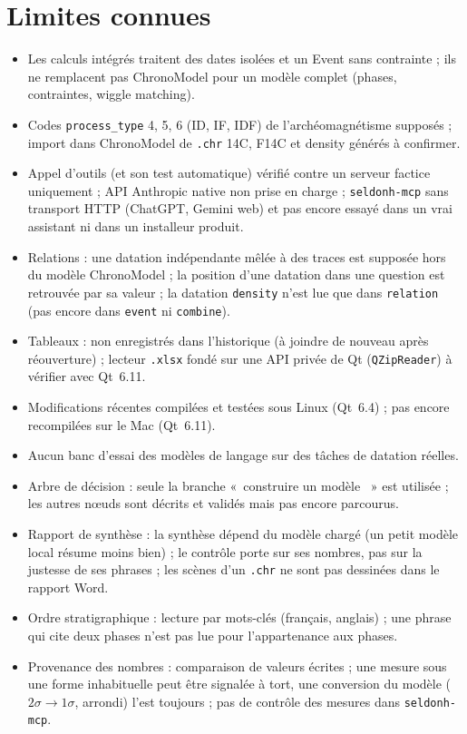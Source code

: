 \documentclass[11pt,a4paper]{article}
\providecommand{\og}{«~}\providecommand{\fg}{\unskip~»}
\newcommand{\code}[1]{\texttt{\small #1}}
\begin{document}
\section{Limites connues}
\begin{itemize}[leftmargin=*]
\item Les calculs intégrés traitent des dates isolées et un Event sans contrainte ; ils ne remplacent pas ChronoModel
  pour un modèle complet (phases, contraintes, wiggle matching).
\item Codes \code{process\_type} 4, 5, 6 (ID, IF, IDF) de l'archéomagnétisme supposés ; import dans ChronoModel de
  \code{.chr} 14C, F14C et density générés à confirmer.
\item Appel d'outils (et son test automatique) vérifié contre un serveur factice uniquement ; API Anthropic native
  non prise en charge ; \code{seldonh-mcp} sans transport HTTP (ChatGPT, Gemini web) et pas encore essayé dans un
  vrai assistant ni dans un installeur produit.
\item Relations : une datation indépendante mêlée à des traces est supposée hors du modèle ChronoModel ; la position
  d'une datation dans une question est retrouvée par sa valeur ; la datation \code{density} n'est lue que dans
  \code{relation} (pas encore dans \code{event} ni \code{combine}).
\item Tableaux : non enregistrés dans l'historique (à joindre de nouveau après réouverture) ; lecteur \code{.xlsx}
  fondé sur une API privée de Qt (\code{QZipReader}) à vérifier avec Qt~6.11.
\item Modifications récentes compilées et testées sous Linux (Qt~6.4) ; pas encore recompilées sur le Mac (Qt~6.11).
\item Aucun banc d'essai des modèles de langage sur des tâches de datation réelles.
\item Arbre de décision : seule la branche \og construire un modèle \fg{} est utilisée ; les autres nœuds sont décrits
  et validés mais pas encore parcourus.
\item Rapport de synthèse : la synthèse dépend du modèle chargé (un petit modèle local résume moins bien) ; le
  contrôle porte sur ses nombres, pas sur la justesse de ses phrases ; les scènes d'un \code{.chr} ne sont pas
  dessinées dans le rapport Word.
\item Ordre stratigraphique : lecture par mots-clés (français, anglais) ; une phrase qui cite deux phases n'est pas lue
  pour l'appartenance aux phases.
\item Provenance des nombres : comparaison de valeurs écrites ; une mesure sous une forme inhabituelle peut être
  signalée à tort, une conversion du modèle ($2\sigma\to1\sigma$, arrondi) l'est toujours ; pas de contrôle des
  mesures dans \code{seldonh-mcp}.
\end{itemize}
\end{document}
